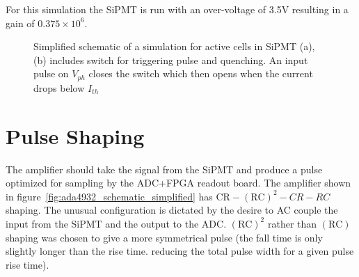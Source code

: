 \documentclass[
12pt, %
a4paper, %
oneside, %
headinclude,footinclude, %
apacite
]{scrartcl}
\begin{document}
For this simulation the SiPMT is run with an over-voltage of 3.5V resulting in a gain of $0.375 \times 10^6$.
\begin{figure}[tb]
\centering 
{} 
\caption[SiPMT simulation circuits]{Simplified schematic of a simulation for active cells in SiPMT (a), (b) includes switch for triggering pulse and quenching. An input pulse on $V_{ph}$ closes the switch which then opens when the current drops below $I_{th}$} 
\label{fig:active_macrocell}
\end{figure}


\section{Pulse Shaping}

The amplifier should take the signal from the SiPMT and produce a pulse optimized for sampling by the ADC+FPGA readout board. The amplifier shown in figure~\ref{fig:ada4932_schematic_simplified} has $\mathrm{CR}-(\mathrm{RC})^2-CR-RC$ shaping. The unusual configuration is dictated by the desire to AC couple the input from the SiPMT and the output to the ADC. $(\mathrm{RC})^2$ rather than $(\mathrm{RC})$ shaping was chosen to give a more symmetrical pulse (the fall time is only slightly longer than the rise time. reducing the total pulse width for a given pulse rise time).   
\end{document}
